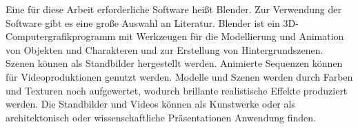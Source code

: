 Eine für diese Arbeit erforderliche Software heißt Blender. Zur Verwendung der Software gibt es eine große Auswahl an Literatur. Blender ist ein 3D-Computergrafikprogramm mit Werkzeugen für die Modellierung und Animation von Objekten und Charakteren und zur Erstellung von Hintergrundszenen. Szenen können als Standbilder hergestellt werden. Animierte Sequenzen können für Videoproduktionen genutzt werden. Modelle und Szenen werden durch Farben und Texturen noch aufgewertet, wodurch brillante realistische Effekte produziert werden. Die Standbilder und Videos können als Kunstwerke oder als architektonisch oder wissenschaftliche Präsentationen Anwendung finden. \cite{blain2020blender}
